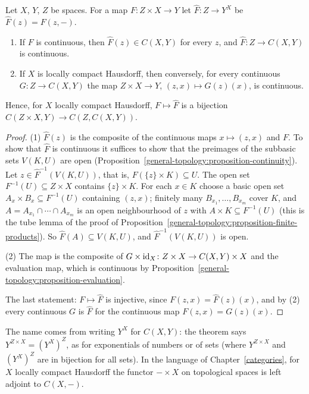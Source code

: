 \begin{theorem}\label{general-topology:theorem-exponential-law}
Let $X$, $Y$, $Z$ be spaces. For a map $F \colon Z \times X \to Y$ let $\hat{F} \colon Z \to Y^X$ be $\hat{F}(z) = F(z, -)$.
\begin{enumerate}
\item If $F$ is continuous, then $\hat{F}(z) \in C(X, Y)$ for every $z$, and $\hat{F} \colon Z \to C(X, Y)$ is continuous.
\item If $X$ is locally compact Hausdorff, then conversely, for every continuous $G \colon Z \to C(X, Y)$ the map $Z \times X \to Y$, $(z, x) \mapsto G(z)(x)$, is continuous.
\end{enumerate}
Hence, for $X$ locally compact Hausdorff, $F \mapsto \hat{F}$ is a bijection $C(Z \times X, Y) \to C(Z, C(X, Y))$.
\end{theorem}

\begin{proof}
(1) $\hat{F}(z)$ is the composite of the continuous maps $x \mapsto (z, x)$ and $F$. To show that $\hat{F}$ is continuous it suffices to show that the preimages of the subbasic sets $V(K, U)$ are open
(Proposition~\ref{general-topology:proposition-continuity}). Let $z \in \hat{F}^{-1}(V(K, U))$, that is, $F(\{z\} \times K) \subseteq U$. The open set $F^{-1}(U) \subseteq Z \times X$ contains
$\{z\} \times K$. For each $x \in K$ choose a basic open set $A_x \times B_x \subseteq F^{-1}(U)$ containing $(z, x)$; finitely many $B_{x_1}, \ldots, B_{x_m}$ cover $K$, and
$A = A_{x_1} \cap \cdots \cap A_{x_m}$ is an open neighbourhood of $z$ with $A \times K \subseteq F^{-1}(U)$ (this is the tube lemma of the proof of
Proposition~\ref{general-topology:proposition-finite-products}). So $\hat{F}(A) \subseteq V(K, U)$, and $\hat{F}^{-1}(V(K, U))$ is open.

(2) The map is the composite of $G \times \mathrm{id}_X \colon Z \times X \to C(X, Y) \times X$ and the evaluation map, which is continuous by
Proposition~\ref{general-topology:proposition-evaluation}.

The last statement: $F \mapsto \hat{F}$ is injective, since $F(z, x) = \hat{F}(z)(x)$, and by (2) every continuous $G$ is $\hat{F}$ for the continuous map $F(z, x) = G(z)(x)$.
\end{proof}

The name comes from writing $Y^X$ for $C(X, Y)$: the theorem says $Y^{Z \times X} = (Y^X)^Z$, as for exponentials of numbers or of sets (where $Y^{Z \times X}$ and $(Y^X)^Z$ are in bijection for
all sets). In the language of Chapter~\ref{categories}, for $X$ locally compact Hausdorff the functor $- \times X$ on topological spaces is left adjoint to $C(X, -)$.

